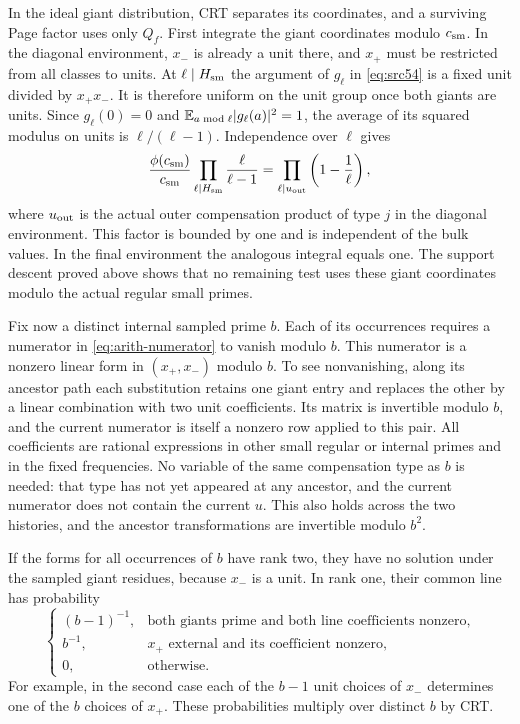 In the ideal giant distribution, CRT separates its coordinates, and a
surviving Page factor uses only $Q_f$. First integrate the giant coordinates
modulo $c_{\rm sm}$. In the diagonal environment, $x_-$ is already a unit
there, and $x_+$ must be restricted from all classes to units. At
$\ell\mid H_{\rm sm}$ the argument of $g_\ell$ in \eqref{eq:src54} is a
fixed unit divided by $x_+x_-$. It is therefore uniform on the unit group
once both giants are units. Since $g_\ell(0)=0$ and
$\mathbb E_{a\bmod\ell}|g_\ell(a)|^2=1$, the average of its squared modulus on
units is $\ell/(\ell-1)$. Independence over $\ell$ gives
\begin{equation}\label{eq:src58}
 \frac{\phi(c_{\rm sm})}{c_{\rm sm}}
    \prod_{\ell\mid H_{\rm sm}}\frac{\ell}{\ell-1}
       =\prod_{\ell\mid u_{\rm out}}\left(1-\frac1\ell\right),
\end{equation}
where $u_{\rm out}$ is the actual outer compensation product of type $j$ in
the diagonal environment. This factor is bounded by one and is independent
of the bulk values. In the final environment the analogous integral equals
one. The support descent proved above shows that no remaining test uses
these giant coordinates modulo the actual regular small primes.

Fix now a distinct internal sampled prime $b$. Each of its occurrences
requires a numerator in \eqref{eq:arith-numerator} to vanish modulo $b$.
This numerator is a nonzero linear form in $(x_+,x_-)$ modulo $b$.
To see nonvanishing, along its ancestor path each substitution retains one
giant entry and replaces the other by a linear combination with two unit
coefficients. Its matrix is invertible modulo $b$, and the current numerator
is itself a nonzero row applied to this pair. All coefficients are rational
expressions in other small regular or internal primes and in the fixed
frequencies. No variable of the same compensation type as $b$ is needed:
that type has not yet appeared at any ancestor, and the current numerator
does not contain the current $u$. This also holds across the two histories,
and the ancestor transformations are invertible modulo $b^2$.

If the forms for all occurrences of $b$ have rank two, they have no solution
under the sampled giant residues, because $x_-$ is a unit. In rank one, their
common line has probability
\begin{equation}\label{eq:arith-line-probabilities}
 \begin{cases}
 (b-1)^{-1},&\text{both giants prime and both line coefficients nonzero},\\
 b^{-1},&\text{$x_+$ external and its coefficient nonzero},\\
 0,&\text{otherwise}.
 \end{cases}
\end{equation}
For example, in the second case each of the $b-1$ unit choices of $x_-$
determines one of the $b$ choices of $x_+$. These probabilities multiply over
distinct $b$ by CRT.

